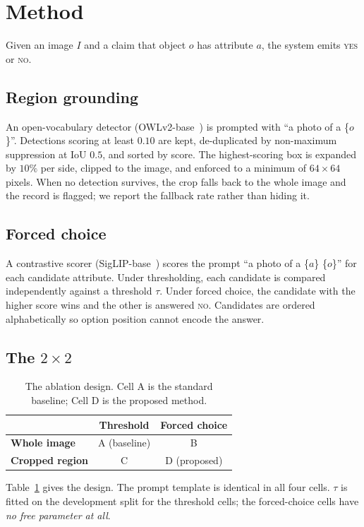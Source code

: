 \documentclass[conference]{IEEEtran}
\begin{document}
\section{Method}

Given an image $I$ and a claim that object $o$ has attribute $a$, the system
emits \textsc{yes} or \textsc{no}.

\subsection{Region grounding}
An open-vocabulary detector (OWLv2-base~\cite{owlv2}) is prompted with
``a photo of a \{$o$\}''. Detections scoring at least $0.10$ are kept,
de-duplicated by non-maximum suppression at IoU $0.5$, and sorted by score. The
highest-scoring box is expanded by $10\%$ per side, clipped to the image, and
enforced to a minimum of $64\times64$ pixels. When no detection survives, the
crop falls back to the whole image and the record is flagged; we report the
fallback rate rather than hiding it.

\subsection{Forced choice}
A contrastive scorer (SigLIP-base~\cite{siglip}) scores the prompt
``a photo of a \{$a$\} \{$o$\}'' for each candidate attribute. Under
thresholding, each candidate is compared independently against a threshold
$\tau$. Under forced choice, the candidate with the higher score wins and the
other is answered \textsc{no}. Candidates are ordered alphabetically so option
position cannot encode the answer.

\subsection{The $2\times2$}
\begin{table}[t]
\caption{The ablation design. Cell A is the standard baseline; Cell D is the
proposed method.}
\label{tab:design}
\centering
\begin{tabular}{lcc}
\toprule
& \textbf{Threshold} & \textbf{Forced choice} \\
\midrule
\textbf{Whole image} & A (baseline) & B \\
\textbf{Cropped region} & C & D (proposed) \\
\bottomrule
\end{tabular}
\end{table}

Table~\ref{tab:design} gives the design. The prompt template is identical in all
four cells. $\tau$ is fitted on the development split for the threshold cells;
the forced-choice cells have \emph{no free parameter at all}.
\end{document}
